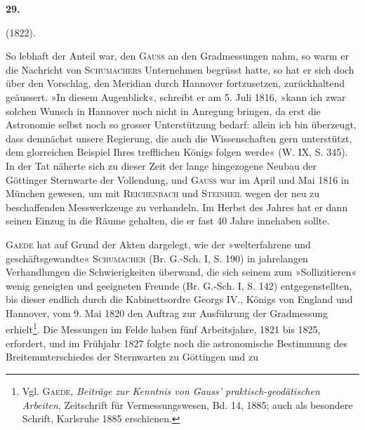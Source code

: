 \clearpage\begingroup{}
\renewcommand{\thefootnote}{\arabic{footnote})}\setcounter{footnote}{0}
\makeatletter\tagsleft@true\let\veqno\leqno\makeatother
\begin{center}
\textbf{29.}\par\smallskip
{} (1822).
\end{center}
\noindent\hspace*{\parindent}So lebhaft der Anteil war, den \textsc{Gauss} an den Gradmessungen nahm, so
warm er die Nachricht von \textsc{Schumachers} Unternehmen begrüsst hatte, so hat
er sich doch über den Vorschlag, den Meridian durch Hannover fortzusetzen,
zurückhaltend geäussert. »In diesem Augenblick«, schreibt er am 5. Juli 1816,
»kann ich zwar solchen Wunsch in Hannover noch nicht in Anregung bringen,
da erst die Astronomie selbst noch so grosser Unterstützung bedarf: allein ich
bin überzeugt, dass demnächst unsere Regierung, die auch die Wissenschaften
gern unterstützt, dem glorreichen Beispiel Ihres trefflichen Königs folgen
werde« (W. IX, S. 345). In der Tat näherte sich zu dieser Zeit der lange
\clearpage{}\setcounter{footnote}{0}
\noindent hingezogene Neubau der Göttinger Sternwarte der Vollendung, und \textsc{Gauss} war
im April und Mai 1816 in München gewesen, um mit \textsc{Reichenbach} und \textsc{Steinheil}
wegen der neu zu beschaffenden Messwerkzeuge zu verhandeln. Im
Herbst des Jahres hat er dann seinen Einzug in die Räume gehalten, die er
fast 40 Jahre innehaben sollte.
\par
\textsc{Gaede} hat auf Grund der Akten dargelegt, wie der »welterfahrene und
geschäftsgewandte« \textsc{Schumacher} (Br. G.-Sch. I, S. 190) in jahrelangen Verhandlungen
die Schwierigkeiten überwand, die sich seinem zum »Sollizitieren«
wenig geneigten und geeigneten Freunde (Br. G.-Sch. I, S. 142) entgegenstellten,
bis dieser endlich durch die Kabinettsordre Georgs IV., Königs von
England und Hannover, vom 9. Mai 1820 den Auftrag zur Ausführung der
Gradmessung erhielt\footnote{Vgl. \textsc{Gaede}, \textit{Beiträge zur Kenntnis von Gauss’ praktisch-geodätischen Arbeiten}, Zeitschrift für Vermessungswesen, Bd. 14, 1885; auch als besondere Schrift, Karlsruhe 1885 erschienen.}. Die Messungen im Felde haben fünf Arbeitsjahre,
1821 bis 1825, erfordert, und im Frühjahr 1827 folgte noch die astronomische
Bestimmung des Breitenunterschiedes der Sternwarten zu Göttingen und zu
